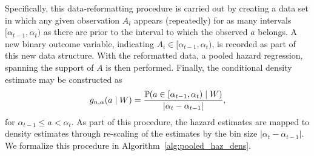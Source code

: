 Specifically, this data-reformatting procedure is carried out by creating a data
set in which any given observation $A_i$ appears (repeatedly) for as many
intervals $[\alpha_{t-1}, \alpha_t)$ as there are prior to the interval to which
the observed $a$ belongs. A new binary outcome variable, indicating $A_i \in
[\alpha_{t-1}, \alpha_t)$, is recorded as part of this new data structure. With
the reformatted data, a pooled hazard regression, spanning the support of $A$ is
then performed. Finally, the conditional density estimate may be constructed as
\begin{equation*}
   g_{n, \alpha}(a \mid W) = \frac{\mathbb{P}(a \in [\alpha_{t-1}, \alpha_t)
      \mid W)}{\lvert \alpha_t - \alpha_{t-1} \rvert},
\end{equation*}
for $\alpha_{t-1} \leq a < \alpha_t$. As part of this procedure, the hazard
estimates are mapped to density estimates through re-scaling of the estimates by
the bin size $\lvert \alpha_t - \alpha_{t-1} \rvert$. We formalize this
procedure in Algorithm~\ref{alg:pooled_haz_dens}.

